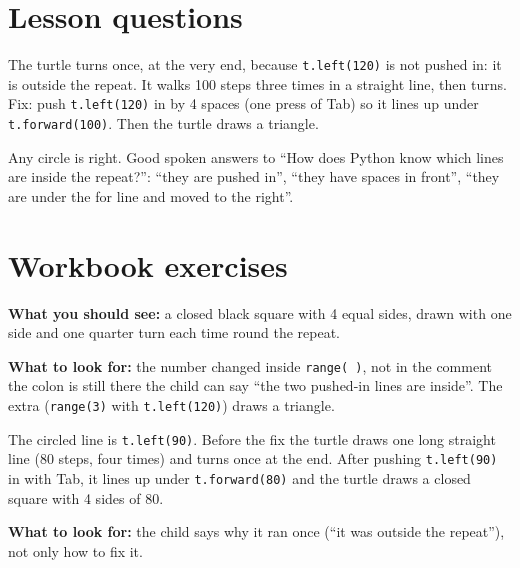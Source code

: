 
\section{Lesson questions}
\begin{answer}
The turtle turns once, at the very end, because \texttt{t.left(120)} is not pushed in: it is outside the repeat. It walks 100 steps three times in a straight line, then turns. Fix: push \texttt{t.left(120)} in by 4 spaces (one press of Tab) so it lines up under \texttt{t.forward(100)}. Then the turtle draws a triangle.
\end{answer}

\begin{answer}[Reflection]
Any circle is right. Good spoken answers to \enquote{How does Python know which lines are inside the repeat?}: \enquote{they are pushed in}, \enquote{they have spaces in front}, \enquote{they are under the for line and moved to the right}.
\end{answer}

\section{Workbook exercises}
\begin{answer}
\textbf{What you should see:} a closed black square with 4 equal sides, drawn with one side and one quarter turn each time round the repeat.

\textbf{What to look for:} \tickbox{} the number changed inside \texttt{range( )}, not in the comment \quad \tickbox{} the colon is still there \quad \tickbox{} the child can say \enquote{the two pushed-in lines are inside}. The extra (\texttt{range(3)} with \texttt{t.left(120)}) draws a triangle.
\end{answer}

\begin{answer}
The circled line is \texttt{t.left(90)}. Before the fix the turtle draws one long straight line (80 steps, four times) and turns once at the end. After pushing \texttt{t.left(90)} in with Tab, it lines up under \texttt{t.forward(80)} and the turtle draws a closed square with 4 sides of 80.

\textbf{What to look for:} the child says why it ran once (\enquote{it was outside the repeat}), not only how to fix it.
\end{answer}

